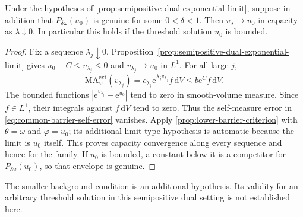 \begin{corollary}\label{cor:semipositive-dual-capacity-limit}
Under the hypotheses of \cref{prop:semipositive-dual-exponential-limit}, suppose in addition that $P_{\delta\omega}(u_0)$ is genuine for some $0<\delta<1$. Then $v_\lambda\to u_0$ in capacity as $\lambda\downarrow0$. In particular this holds if the threshold solution $u_0$ is bounded.
\end{corollary}
\begin{proof}
Fix a sequence $\lambda_j\downarrow0$. Proposition~\ref{prop:semipositive-dual-exponential-limit} gives $u_0-C\leq v_{\lambda_j}\leq0$ and $v_{\lambda_j}\to u_0$ in $L^1$. For all large $j$,
\[
 \mathrm{MA}^{\mathrm{ext}}_\omega(v_{\lambda_j})
   =c_{\lambda_j}\mathrm{e}^{\lambda_jv_{\lambda_j}}f\,\mathrm{d}V
   \leq b\mathrm{e}^{C}f\,\mathrm{d}V.
\]
The bounded functions $|\mathrm{e}^{v_{\lambda_j}}-\mathrm{e}^{u_0}|$ tend to zero in smooth-volume measure. Since $f\in L^1$, their integrals against $f\,\mathrm{d}V$ tend to zero. Thus the self-measure error in \eqref{eq:common-barrier-self-error} vanishes. Apply \cref{prop:lower-barrier-criterion} with $\theta=\omega$ and $\varphi=u_0$; its additional limit-type hypothesis is automatic because the limit is $u_0$ itself. This proves capacity convergence along every sequence and hence for the family. If $u_0$ is bounded, a constant below it is a competitor for $P_{\delta\omega}(u_0)$, so that envelope is genuine.
\end{proof}

The smaller-background condition is an additional hypothesis. Its validity for an arbitrary threshold solution in this semipositive dual setting is not established here.
